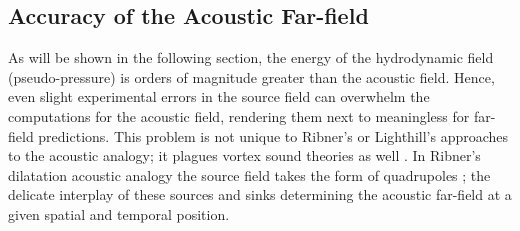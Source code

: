 \subsection{Accuracy of the Acoustic Far-field}
As will be shown in the following section, the energy of the hydrodynamic field (pseudo-pressure) is orders of magnitude greater than the acoustic field.
Hence, even slight experimental errors in the source field can overwhelm the computations for the acoustic field, rendering them next to meaningless for far-field predictions.
This problem is not unique to Ribner's or Lighthill's approaches to the acoustic analogy; it plagues vortex sound theories as well \citep{Bridges1992}.
In Ribner's dilatation acoustic analogy the source field takes the form of quadrupoles \citep{Ristorcelli1997}; the delicate interplay of these sources and sinks determining the acoustic far-field at a given spatial and temporal position.

